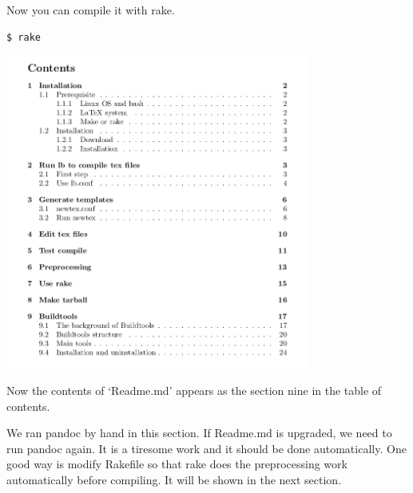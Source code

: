 Now you can compile it with rake.
\begin{verbatim}
$ rake
\end{verbatim}

\begin{center}
\includegraphics[width=10cm]{tableofcontents.png}
\end{center}

Now the contents of `Readme.md' appears as the section nine in the table of contents.

We ran pandoc by hand in this section.
If Readme.md is upgraded, we need to run pandoc again.
It is a tiresome work and it should be done automatically.
One good way is modify Rakefile so that rake does the preprocessing work automatically before compiling.
It will be shown in the next section.

